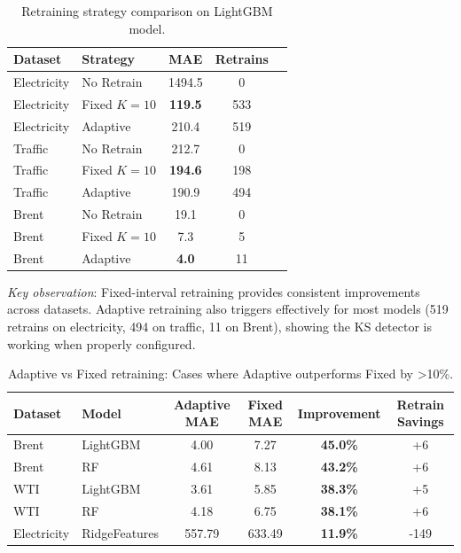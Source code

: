 \documentclass[conference]{IEEEtran}
\begin{document}
\begin{table}[!t]
	\centering
	\caption{Retraining strategy comparison on LightGBM model.}
	\label{tab:retrain-comparison}
	\begin{tabular}{ll|ccc}
		\toprule
		Dataset     & Strategy     & MAE            & Retrains \\
		\midrule
		Electricity & No Retrain   & 1494.5         & 0        \\
		Electricity & Fixed $K=10$ & \textbf{119.5} & 533      \\
		Electricity & Adaptive     & 210.4          & 519      \\
		\midrule
		Traffic     & No Retrain   & 212.7          & 0        \\
		Traffic     & Fixed $K=10$ & \textbf{194.6} & 198      \\
		Traffic     & Adaptive     & 190.9          & 494      \\
		\midrule
		Brent       & No Retrain   & 19.1           & 0        \\
		Brent       & Fixed $K=10$ & 7.3            & 5        \\
		Brent       & Adaptive     & \textbf{4.0}   & 11       \\
		\bottomrule
	\end{tabular}
\end{table}

\textit{Key observation}: Fixed-interval retraining provides consistent
improvements across datasets. Adaptive retraining also triggers effectively
for most models (519 retrains on electricity, 494 on traffic, 11 on Brent),
showing the KS detector is working when properly configured.

\begin{table}[!t]
	\centering
	\caption{Adaptive vs Fixed retraining: Cases where Adaptive outperforms Fixed by >10\%.}
	\label{tab:adaptive-wins}
	\begin{tabular}{ll|ccc|c}
		\toprule
		Dataset     & Model         & Adaptive MAE & Fixed MAE & Improvement     & Retrain Savings \\
		\midrule
		Brent       & LightGBM      & 4.00         & 7.27      & \textbf{45.0\%} & +6              \\
		Brent       & RF            & 4.61         & 8.13      & \textbf{43.2\%} & +6              \\
		WTI         & LightGBM      & 3.61         & 5.85      & \textbf{38.3\%} & +5              \\
		WTI         & RF            & 4.18         & 6.75      & \textbf{38.1\%} & +6              \\
		Electricity & RidgeFeatures & 557.79       & 633.49    & \textbf{11.9\%} & -149            \\
		\bottomrule
	\end{tabular}
\end{table}
\end{document}
